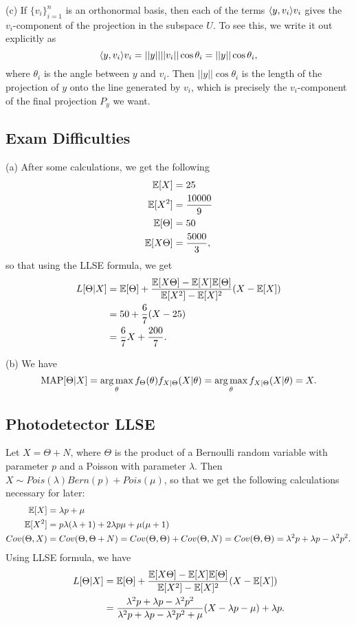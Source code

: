 (c) If $\{v_i\}_{i = 1}^n$ is an orthonormal basis, then each of the terms $\langle y, v_i\rangle v_i$ gives the $v_i$-component of the projection in the subspace $U$. To see this, we write it out explicitly as
\[
\langle y, v_i\rangle v_i = ||y||||v_i||\cos\theta_i = ||y||\cos\theta_i,
\]
where $\theta_i$ is the angle between $y$ and $v_i$. Then $||y||\cos\theta_i$ is the length of the projection of $y$ onto the line generated by $v_i$, which is precisely the $v_i$-component of the final projection $P_y$ we want.


\subsection{Exam Difficulties}
(a) After some calculations, we get the following
\begin{align*}
    \mathbb{E}[X] &= 25 \\
    \mathbb{E}[X^2] &= \frac{10000}{9} \\
    \mathbb{E}[\Theta] &= 50 \\
    \mathbb{E}[X\Theta] &= \frac{5000}{3},
\end{align*}
so that using the LLSE formula, we get
\begin{align*}
    L[\Theta | X] &= \mathbb{E}[\Theta] + \frac{\mathbb{E}[X\Theta] - \mathbb{E}[X]\mathbb{E}[\Theta]}{\mathbb{E}[X^2] - \mathbb{E}[X]^2}(X - \mathbb{E}[X]) \\
    &= 50 + \frac{6}{7}(X - 25) \\
    &= \frac{6}{7}X + \frac{200}{7}.
\end{align*}

(b) We have
\[
\text{MAP}[\Theta | X] = \operatorname*{arg\,max}_\theta f_{\Theta}(\theta)f_{X|\Theta}(X|\theta) = \operatorname*{arg\,max}_\theta f_{X | \Theta}(X|\theta) = X.
\]


\subsection{Photodetector LLSE}
Let $X = \Theta + N$, where $\Theta$ is the product of a Bernoulli random variable with parameter $p$ and a Poisson with parameter $\lambda$. Then $X \sim Pois(\lambda)Bern(p) + Pois(\mu)$, so that we get the following calculations necessary for later:
\begin{align*}
    \mathbb{E}[X] &= \lambda p + \mu \\
    \mathbb{E}[X^2] &= p\lambda(\lambda + 1) + 2\lambda p\mu + \mu(\mu + 1) \\
    Cov(\Theta, X) &= Cov(\Theta, \Theta + N) = Cov(\Theta, \Theta) + Cov(\Theta, N) = Cov(\Theta, \Theta) = \lambda^2 p + \lambda p - \lambda^2 p^2.
\end{align*}
Using LLSE formula, we have
\begin{align*}
    L[\Theta | X] &= \mathbb{E}[\Theta] + \frac{\mathbb{E}[X\Theta] - \mathbb{E}[X]\mathbb{E}[\Theta]}{\mathbb{E}[X^2] - \mathbb{E}[X]^2}(X - \mathbb{E}[X]) \\
    &= \frac{\lambda^2 p + \lambda p - \lambda^2 p^2}{\lambda^2 p + \lambda p - \lambda^2 p^2 + \mu}(X - \lambda p - \mu) + \lambda p.
\end{align*}

